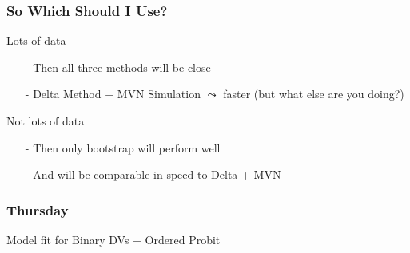 \documentclass{beamer}
\begin{document}
\begin{frame}
\frametitle{So Which Should I Use?}

Lots of data
\begin{itemize}
\item[-] Then all three methods will be close
\item[-] Delta Method + MVN Simulation $\leadsto$ faster (but what else are you doing?)
\end{itemize}

Not lots of data

\begin{itemize}
\item[-] Then only bootstrap will perform well 
\item[-] And will be comparable in speed to Delta + MVN
\end{itemize}




\end{frame}


\begin{frame}
\frametitle{Thursday}


Model fit for Binary DVs + Ordered Probit


\end{frame}
\end{document}
